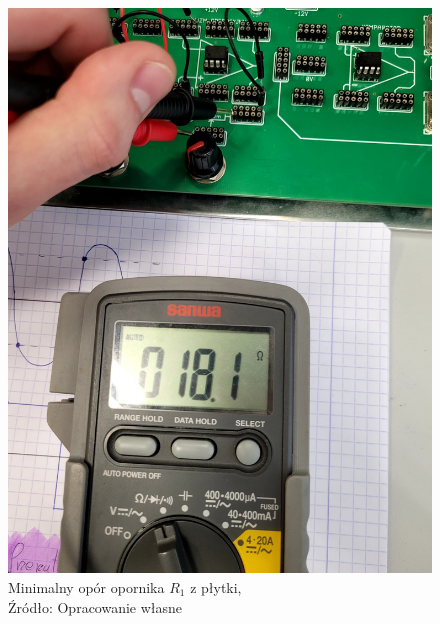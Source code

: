 \documentclass{article}
\begin{document}
\begin{figure}[!ht]
\begin{minipage}{.5\textwidth}
          \includegraphics[scale=0.08]{grafiki/r_min.jpg} 
          \caption{Minimalny opór opornika $R_1$ z płytki,
          \\Źródło: Opracowanie własne}
      \end{minipage}
    \end{figure}
\end{document}
